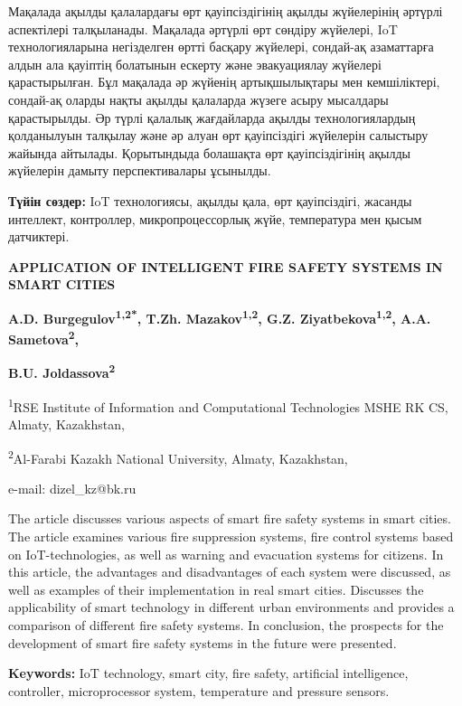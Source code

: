 Мақалада ақылды қалалардағы өрт қауіпсіздігінің ақылды
жүйелерінің әртүрлі аспектілері талқыланады. Мақалада әртүрлі өрт
сөндіру жүйелері, IoT технологияларына негізделген өртті басқару
жүйелері, сондай-ақ азаматтарға алдын ала қауіптің болатынын ескерту
және эвакуациялау жүйелері қарастырылған. Бұл мақалада әр жүйенің
артықшылықтары мен кемшіліктері, сондай-ақ оларды нақты ақылды қалаларда
жүзеге асыру мысалдары қарастырылды. Әр түрлі қалалық жағдайларда ақылды
технологиялардың қолданылуын талқылау және әр алуан өрт қауіпсіздігі
жүйелерін салыстыру жайында айтылады. Қорытындыда болашақта өрт
қауіпсіздігінің ақылды жүйелерін дамыту перспективалары
ұсынылды.

{\bfseries Түйін сөздер:} IoT технологиясы,
ақылды қала, өрт қауіпсіздігі, жасанды интеллект, контроллер,
микропроцессорлық жүйе, температура мен қысым
датчиктері.

\begin{center}
{\large\bfseries APPLICATION OF INTELLIGENT FIRE SAFETY SYSTEMS IN SMART CITIES}

{\bfseries A.D. Burgegulov\textsuperscript{1,2*}, T.Zh.
Mazakov\textsuperscript{1,2}, G.Z. Ziyatbekova\textsuperscript{1,2},
A.A. Sametova\textsuperscript{2},}

{\bfseries B.U. Joldassova\textsuperscript{2}}

\textsuperscript{1}RSE Institute of Information and Computational
Technologies MSHE RK CS, Almaty, Kazakhstan,

\textsuperscript{2}Al-Farabi Kazakh National
University, Almaty, Kazakhstan,

e-mail: dizel\_kz@bk.ru
\end{center}

The article discusses various aspects of smart fire safety
systems in smart cities. The article examines various fire suppression
systems, fire control systems based on IoT-technologies, as well as
warning and evacuation systems for citizens. In this article, the
advantages and disadvantages of each system were discussed, as well as
examples of their implementation in real smart cities. Discusses the
applicability of smart technology in different urban environments and
provides a comparison of different fire safety systems. In conclusion,
the prospects for the development of smart fire safety systems in the
future were
presented.

{\bfseries Keywords:} IoT technology, smart
city, fire safety, artificial intelligence, controller, microprocessor
system, temperature and pressure
sensors.

